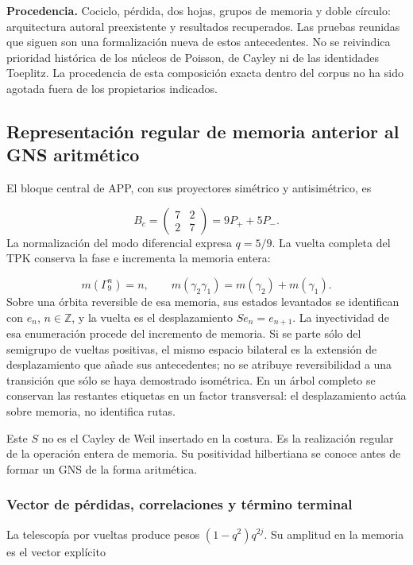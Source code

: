 \textbf{Procedencia.} Cociclo, pérdida, dos hojas, grupos de memoria y doble círculo: arquitectura autoral preexistente y resultados recuperados. Las pruebas reunidas que siguen son una formalización nueva de estos antecedentes. No se reivindica prioridad histórica de los núcleos de Poisson, de Cayley ni de las identidades Toeplitz. La procedencia de esta composición exacta dentro del corpus no ha sido agotada fuera de los propietarios indicados.


\subsection{Representación regular de memoria anterior al GNS aritmético}
\label{tm-add-m2}
El bloque central de APP, con sus proyectores simétrico y antisimétrico, es

\[
B_c=\begin{pmatrix}7&2\\2&7\end{pmatrix}
=9P_++5P_-.
\]
La normalización del modo diferencial expresa \(q=5/9\). La vuelta completa del TPK conserva la fase e incrementa la memoria entera:

\[
m(\Gamma_9^n)=n,\qquad
m(\gamma_2\gamma_1)=m(\gamma_2)+m(\gamma_1).
\]
Sobre una órbita reversible de esa memoria, sus estados levantados se identifican con \(e_n\), \(n\in\mathbb Z\), y la vuelta es el desplazamiento \(Se_n=e_{n+1}\). La inyectividad de esa enumeración procede del incremento de memoria. Si se parte sólo del semigrupo de vueltas positivas, el mismo espacio bilateral es la extensión de desplazamiento que añade sus antecedentes; no se atribuye reversibilidad a una transición que sólo se haya demostrado isométrica. En un árbol completo se conservan las restantes etiquetas en un factor transversal: el desplazamiento actúa sobre memoria, no identifica rutas.

Este \(S\) no es el Cayley de Weil insertado en la costura. Es la realización regular de la operación entera de memoria. Su positividad hilbertiana se conoce antes de formar un GNS de la forma aritmética.


\subsubsection{Vector de pérdidas, correlaciones y término terminal}
\label{tm-add-m2-1}
La telescopía por vueltas produce pesos \((1-q^2)q^{2j}\). Su amplitud en la memoria es el vector explícito

